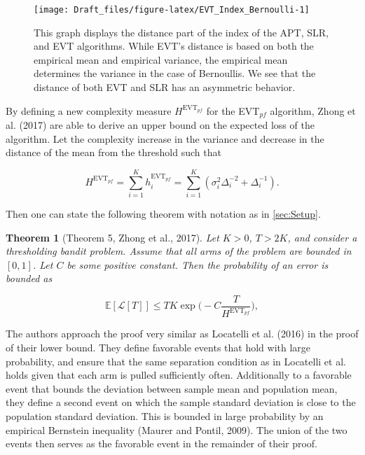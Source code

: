 \documentclass[11pt,]{article}
\newtheorem{theorem}{Theorem}
\begin{document}
\begin{figure}

{\centering \texttt{[image: Draft\_files/figure-latex/EVT\_Index\_Bernoulli-1]} 

}

\caption{This graph displays the distance part of the index of the APT, SLR, and EVT algorithms. While EVT's distance is based on both the empirical mean and empirical variance, the empirical mean determines the variance in the case of Bernoullis. We see that the distance of both EVT and SLR has an asymmetric behavior.}\label{fig:EVT_Index_Bernoulli}
\end{figure}

By defining a new complexity measure \(H^{\text{EVT}_{pf}}\) for the
EVT\(_{pf}\) algorithm, Zhong et al. (2017) are able to derive an upper
bound on the expected loss of the algorithm. Let the complexity increase
in the variance and decrease in the distance of the mean from the
threshold such that

\[
H^{\text{EVT}_{pf}} = \sum_{i=1}^K h_i^{\text{EVT}_{pf}} = \sum_{i=1}^K (\sigma_i^2\Delta_i^{-2} + \Delta_i^{-1}).
\]

Then one can state the following theorem with notation as in
\autoref{sec:Setup}.

\begin{theorem}[Theorem 5, Zhong et al., 2017] 
\label{theorem:ZhongEtAl2017Theorem5}
Let $K > 0$, $T > 2K$, and consider a thresholding bandit problem. Assume that all arms of the problem are bounded in $[0,1]$. Let $C$ be some positive constant. Then the probability of an error is bounded as

\begin{equation*}
\mathbb{E}[\mathcal{L}[T]] \leq TK \exp\Big(-C\frac{T}{H^{\text{EVT}_{pf}}}\Big),
\end{equation*}
\end{theorem}

The authors approach the proof very similar as Locatelli et al. (2016)
in the proof of their lower bound. They define favorable events that
hold with large probability, and ensure that the same separation
condition as in Locatelli et al. holds given that each arm is pulled
sufficiently often. Additionally to a favorable event that bounds the
deviation between sample mean and population mean, they define a second
event on which the sample standard deviation is close to the population
standard deviation. This is bounded in large probability by an empirical
Bernstein inequality (Maurer and Pontil, 2009). The union of the two
events then serves as the favorable event in the remainder of their
proof.
\end{document}
